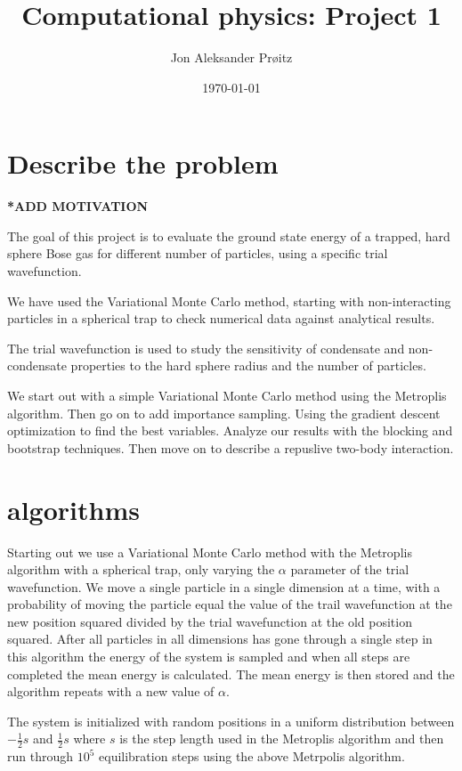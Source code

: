 \documentclass[a4paper, 10pt, english]{revtex4-2} %
\begin{document}
\vspace*{1.5cm}
\title{\LARGE Computational physics: Project 1}
\author{Jon Aleksander Prøitz}
\date{\today}
\noaffiliation
\maketitle

\section*{\large Describe the problem}
    \textbf{*ADD MOTIVATION}

    The goal of this project is to evaluate the ground state energy of a trapped, hard sphere Bose gas for different number of particles, using a specific trial wavefunction.

    We have used the Variational Monte Carlo method, starting with non-interacting particles in a spherical trap to check numerical data against analytical results.
    
    The trial wavefunction is used to study the sensitivity of condensate and non-condensate properties to the hard sphere radius and the number of particles.

    We start out with a simple Variational Monte Carlo method using the Metroplis algorithm.
    Then go on to add importance sampling.
    Using the gradient descent optimization to find the best variables.
    Analyze our results with the blocking and bootstrap techniques.
    Then move on to describe a repuslive two-body interaction.

\section*{\large algorithms}
    Starting out we use a Variational Monte Carlo method with the Metroplis algorithm with a spherical trap, only varying the $\alpha$ parameter of the trial wavefunction.
    We move a single particle in a single dimension at a time, with a probability of moving the particle equal the value of the trail wavefunction at the new position squared divided by the trial wavefunction at the old position squared.
    After all particles in all dimensions has gone through a single step in this algorithm the energy of the system is sampled and when all steps are completed the mean energy is calculated.
    The mean energy is then stored and the algorithm repeats with a new value of $\alpha$.

    The system is initialized with random positions in a uniform distribution between $-\frac{1}{2}s$ and $\frac{1}{2}s$ where $s$ is the step length used in the Metroplis algorithm and then run through $10^5$ equilibration steps using the above Metrpolis algorithm.
\end{document}
